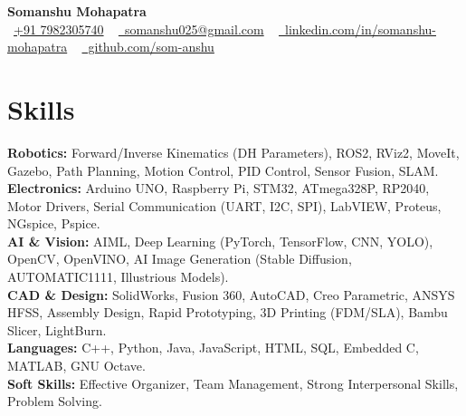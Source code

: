 \documentclass[letterpaper,10pt]{article}
\begin{document}
\begin{center}
    {\Huge \textmd{\textbf{Somanshu Mohapatra}}} \\ \vspace{4pt}
    \small \faPhone\ \href{tel:+917982305740}{+91 7982305740} ~ 
    \href{mailto:somanshu025@gmail.com}{\faEnvelope\ somanshu025@gmail.com} ~ 
    \href{https://linkedin.com/in/somanshu-mohapatra}{\faLinkedin\ linkedin.com/in/somanshu-mohapatra} ~
    \href{https://github.com/som-anshu}{\faGithub\ github.com/som-anshu}
\end{center}
\vspace{-8pt}

\section{Skills}
 \begin{itemize}[leftmargin=0.15in, label={}]
    \small{\item{
     \textbf{Robotics:}{ Forward/Inverse Kinematics (DH Parameters), ROS2, RViz2, MoveIt, Gazebo, Path Planning, Motion Control, PID Control, Sensor Fusion, SLAM.} \\
     \textbf{Electronics:}{ Arduino UNO, Raspberry Pi, STM32, ATmega328P, RP2040, Motor Drivers, Serial Communication (UART, I2C, SPI), LabVIEW, Proteus, NGspice, Pspice.} \\
     \textbf{AI \& Vision:}{ AIML, Deep Learning (PyTorch, TensorFlow, CNN, YOLO), OpenCV, OpenVINO, AI Image Generation (Stable Diffusion, AUTOMATIC1111, Illustrious Models).} \\
     \textbf{CAD \& Design:}{ SolidWorks, Fusion 360, AutoCAD, Creo Parametric, ANSYS HFSS, Assembly Design, Rapid Prototyping, 3D Printing (FDM/SLA), Bambu Slicer, LightBurn.} \\
     \textbf{Languages:}{ C++, Python, Java, JavaScript, HTML, SQL, Embedded C, MATLAB, GNU Octave.} \\
     \textbf{Soft Skills:}{ Effective Organizer, Team Management, Strong Interpersonal Skills, Problem Solving.}
    }}
 \end{itemize}
\vspace{-8pt}

\end{document}
